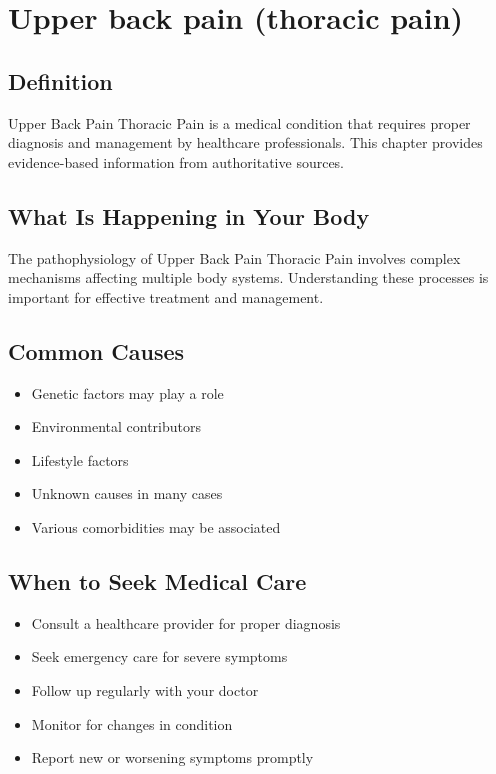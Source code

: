 
\chapter{Upper back pain (thoracic pain)}

\section*{Definition}
Upper Back Pain Thoracic Pain is a medical condition that requires proper diagnosis and management by healthcare professionals. This chapter provides evidence-based information from authoritative sources.

\section*{What Is Happening in Your Body}
The pathophysiology of Upper Back Pain Thoracic Pain involves complex mechanisms affecting multiple body systems. Understanding these processes is important for effective treatment and management.

\section*{Common Causes}
\begin{itemize}
  \item Genetic factors may play a role
  \item Environmental contributors
  \item Lifestyle factors
  \item Unknown causes in many cases
  \item Various comorbidities may be associated
\end{itemize}

\section*{When to Seek Medical Care}
\begin{itemize}
  \item Consult a healthcare provider for proper diagnosis
  \item Seek emergency care for severe symptoms
  \item Follow up regularly with your doctor
  \item Monitor for changes in condition
  \item Report new or worsening symptoms promptly
\end{itemize}


